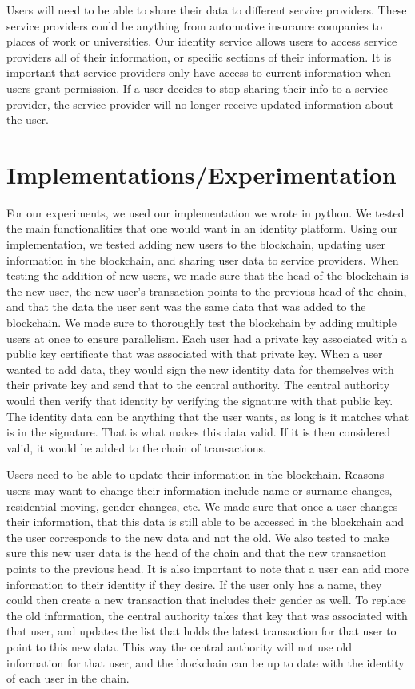 \documentclass[letterpaper, 10 pt, conference]{ieeeconf}  %
\begin{document}
Users will need to be able to share their data to different service providers.  These service providers could be anything from automotive insurance companies to places of work or universities.  Our identity service allows users to access service providers all of their information, or specific sections of their information.  It is important that service providers only have access to current information when users grant permission.  If a user decides to stop sharing their info to a service provider, the service provider will no longer receive updated information about the user.

\section{Implementations/Experimentation}

For our experiments, we used our implementation we wrote in python.  We tested the main functionalities that one would want in an identity platform.  Using our implementation, we tested adding new users to the blockchain, updating user information in the blockchain, and sharing user data to service providers.  When testing the addition of new users, we made sure that the head of the blockchain is the new user, the new user's transaction points to the previous head of the chain, and that the data the user sent was the same data that was added to the blockchain.  We made sure to thoroughly test the blockchain by adding multiple users at once to ensure parallelism. Each user had a private key associated with a public key certificate that was associated with that private key. When a user wanted to add data, they would sign the new identity data for themselves with their private key and send that to the central authority. The central authority would then verify that identity by verifying the signature with that public key. The identity data can be anything that the user wants, as long is it matches what is in the signature. That is what makes this data valid. If it is then considered valid, it would be added to the chain of transactions. 

Users need to be able to update their information in the blockchain.  Reasons users may want to change their information include name or surname changes, residential moving, gender changes, etc.  We made sure that once a user changes their information, that this data is still able to be accessed in the blockchain and the user corresponds to the new data and not the old.  We also tested to make sure this new user data is the head of the chain and that the new transaction points to the previous head. It is also important to note that a user can add more information to their identity if they desire. If the user only has a name, they could then create a new transaction that includes their gender as well. To replace the old information, the central authority takes that key that was associated with that user, and updates the list that holds the latest transaction for that user to point to this new data. This way the central authority will not use old information for that user, and the blockchain can be up to date with the identity of each user in the chain.
\end{document}
